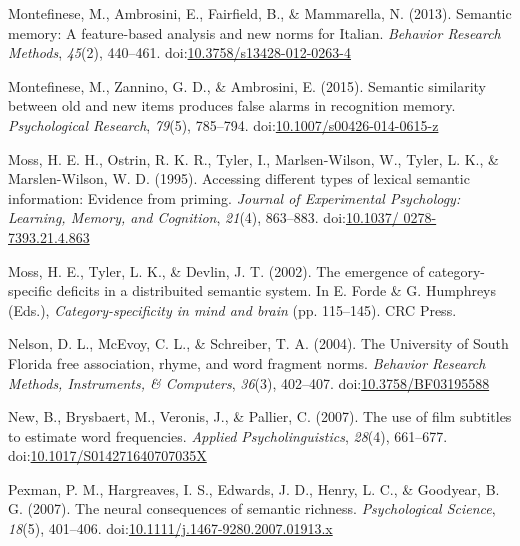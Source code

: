 \documentclass[english,,man]{apa6}
\begin{document}
\leavevmode\hypertarget{ref-Montefinese2013}{}%
Montefinese, M., Ambrosini, E., Fairfield, B., \& Mammarella, N. (2013). Semantic memory: A feature-based analysis and new norms for Italian. \emph{Behavior Research Methods}, \emph{45}(2), 440--461. doi:\href{https://doi.org/10.3758/s13428-012-0263-4}{10.3758/s13428-012-0263-4}

\leavevmode\hypertarget{ref-Montefinese2015}{}%
Montefinese, M., Zannino, G. D., \& Ambrosini, E. (2015). Semantic similarity between old and new items produces false alarms in recognition memory. \emph{Psychological Research}, \emph{79}(5), 785--794. doi:\href{https://doi.org/10.1007/s00426-014-0615-z}{10.1007/s00426-014-0615-z}

\leavevmode\hypertarget{ref-Moss1995}{}%
Moss, H. E. H., Ostrin, R. K. R., Tyler, I., Marlsen-Wilson, W., Tyler, L. K., \& Marslen-Wilson, W. D. (1995). Accessing different types of lexical semantic information: Evidence from priming. \emph{Journal of Experimental Psychology: Learning, Memory, and Cognition}, \emph{21}(4), 863--883. doi:\href{https://doi.org/10.1037/\%200278-7393.21.4.863}{10.1037/ 0278-7393.21.4.863}

\leavevmode\hypertarget{ref-Moss2002}{}%
Moss, H. E., Tyler, L. K., \& Devlin, J. T. (2002). The emergence of category-specific deficits in a distribuited semantic system. In E. Forde \& G. Humphreys (Eds.), \emph{Category-specificity in mind and brain} (pp. 115--145). CRC Press.

\leavevmode\hypertarget{ref-Nelson2004}{}%
Nelson, D. L., McEvoy, C. L., \& Schreiber, T. A. (2004). The University of South Florida free association, rhyme, and word fragment norms. \emph{Behavior Research Methods, Instruments, \& Computers}, \emph{36}(3), 402--407. doi:\href{https://doi.org/10.3758/BF03195588}{10.3758/BF03195588}

\leavevmode\hypertarget{ref-New2007}{}%
New, B., Brysbaert, M., Veronis, J., \& Pallier, C. (2007). The use of film subtitles to estimate word frequencies. \emph{Applied Psycholinguistics}, \emph{28}(4), 661--677. doi:\href{https://doi.org/10.1017/S014271640707035X}{10.1017/S014271640707035X}

\leavevmode\hypertarget{ref-Pexman2007}{}%
Pexman, P. M., Hargreaves, I. S., Edwards, J. D., Henry, L. C., \& Goodyear, B. G. (2007). The neural consequences of semantic richness. \emph{Psychological Science}, \emph{18}(5), 401--406. doi:\href{https://doi.org/10.1111/j.1467-9280.2007.01913.x}{10.1111/j.1467-9280.2007.01913.x}
\end{document}
